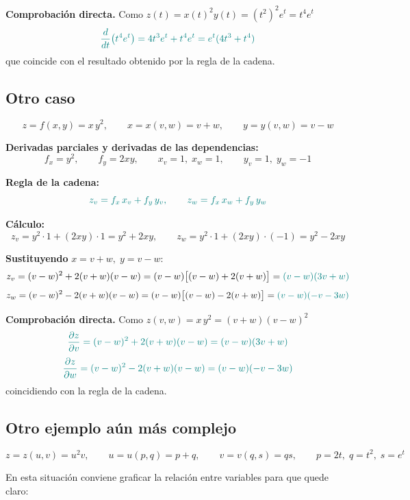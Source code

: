\documentclass{article}
\begin{document}
\textbf{Comprobación directa.}
Como \(z(t)=x(t)^{2}y(t)=(t^{2})^{2}e^{t}=t^{4}e^{t}\)
\[ \color{teal}
\frac{d}{dt}\big(t^{4}e^{t}\big)
=4t^{3}e^{t}+t^{4}e^{t}
= e^{t}(4t^{3}+t^{4})
\]
que coincide con el resultado obtenido por la regla de la cadena.



\subsection*{Otro caso}

\[
z=f(x,y)=x\,y^{2}, 
\qquad x=x(v,w)=v+w, 
\qquad y=y(v,w)=v-w
\]

\textbf{Derivadas parciales y derivadas de las dependencias:}
\[
f_x=y^{2},\qquad f_y=2xy,\qquad 
x_v=1,\; x_w=1,\qquad 
y_v=1,\; y_w=-1
\]

\textbf{Regla de la cadena:}
\[\color{teal}
{\;z_v=f_x\,x_v+f_y\,y_v,\qquad z_w=f_x\,x_w+f_y\,y_w\;}
\]

\textbf{Cálculo:}
\[
z_v = y^{2}\cdot 1 + (2xy)\cdot 1 = y^{2}+2xy,
\qquad
z_w = y^{2}\cdot 1 + (2xy)\cdot(-1) = y^{2}-2xy
\]

\textbf{Sustituyendo } \(x=v+w,\; y=v-w\):
\[
z_v = (v-w)^{2} + 2(v+w)(v-w)
     = (v-w)\big[(v-w)+2(v+w)\big]
     =\color{teal} (v-w)(3v+w)
\]
\[
z_w = (v-w)^{2} - 2(v+w)(v-w)
     = (v-w)\big[(v-w)-2(v+w)\big]
     =\color{teal} (v-w)(-v-3w)
\]

\textbf{Comprobación directa.}
Como \(z(v,w)=x\,y^{2}=(v+w)(v-w)^{2}\)
\[\color{teal}
\frac{\partial z}{\partial v}
= (v-w)^{2}+2(v+w)(v-w)
= (v-w)(3v+w)
\]
\[\color{teal}
\frac{\partial z}{\partial w}
= (v-w)^{2}-2(v+w)(v-w)
= (v-w)(-v-3w)
\]
coincidiendo con la regla de la cadena.



\subsection*{Otro ejemplo aún más complejo}
\[
z=z(u,v)=u^{2}v,
\qquad
u=u(p,q)=p+q,
\qquad
v=v(q,s)=qs,
\qquad
p=2t,\; q=t^{2},\; s=e^{t}
\]

En esta situación conviene graficar la relación entre variables para que quede claro:

\begin{center}
\end{center}
\end{document}

